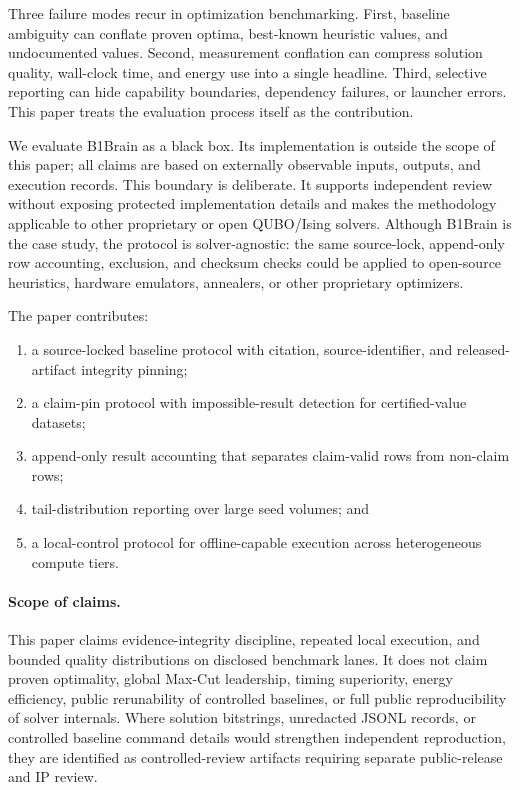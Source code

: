 \documentclass[11pt]{article}
\begin{document}
Three failure modes recur in optimization benchmarking. First, baseline ambiguity can conflate proven optima, best-known heuristic values, and undocumented values. Second, measurement conflation can compress solution quality, wall-clock time, and energy use into a single headline. Third, selective reporting can hide capability boundaries, dependency failures, or launcher errors. This paper treats the evaluation process itself as the contribution.

We evaluate B1Brain as a black box. Its implementation is outside the scope of this paper; all claims are based on externally observable inputs, outputs, and execution records. This boundary is deliberate. It supports independent review without exposing protected implementation details and makes the methodology applicable to other proprietary or open QUBO/Ising solvers.
Although B1Brain is the case study, the protocol is solver-agnostic: the same source-lock, append-only row accounting, exclusion, and checksum checks could be applied to open-source heuristics, hardware emulators, annealers, or other proprietary optimizers.

The paper contributes:
\begin{enumerate}
  \item a source-locked baseline protocol with citation, source-identifier, and released-artifact integrity pinning;
  \item a claim-pin protocol with impossible-result detection for certified-value datasets;
  \item append-only result accounting that separates claim-valid rows from non-claim rows;
  \item tail-distribution reporting over large seed volumes; and
  \item a local-control protocol for offline-capable execution across heterogeneous compute tiers.
\end{enumerate}

\paragraph{Scope of claims.}
This paper claims evidence-integrity discipline, repeated local execution, and bounded quality distributions on disclosed benchmark lanes. It does not claim proven optimality, global Max-Cut leadership, timing superiority, energy efficiency, public rerunability of controlled baselines, or full public reproducibility of solver internals. Where solution bitstrings, unredacted JSONL records, or controlled baseline command details would strengthen independent reproduction, they are identified as controlled-review artifacts requiring separate public-release and IP review.
\end{document}
